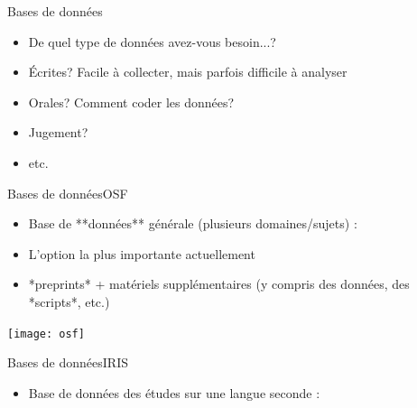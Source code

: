 \documentclass[xcolor=dvipsnames, onlymath, 10pt, aspectratio=169, handout]{beamer}
\begin{document}

\begin{frame}{Bases de données}

	\begin{itemize}
		\item[] De quel type de données avez-vous besoin...?
		\item Écrites? Facile à collecter, mais parfois difficile à analyser
		\item Orales? Comment coder les données?
		\item Jugement?
		\item etc.
	\end{itemize}

\end{frame}




\begin{frame}{Bases de données}{OSF}

	\begin{itemize}
		\item Base de **données** générale (plusieurs domaines/sujets) : 
		\item L'option la plus importante actuellement
		\item *preprints* + matériels supplémentaires (y compris des données, des *scripts*, etc.)

	\end{itemize}

	\begin{center}
		{\texttt{[image: osf]}}
	\end{center}

\end{frame}





\begin{frame}{Bases de données}{IRIS}

	\begin{itemize}
		\item Base de données des études sur une langue seconde : 
	\end{itemize}

	\begin{center}
	\end{center}

\end{frame}
\end{document}
